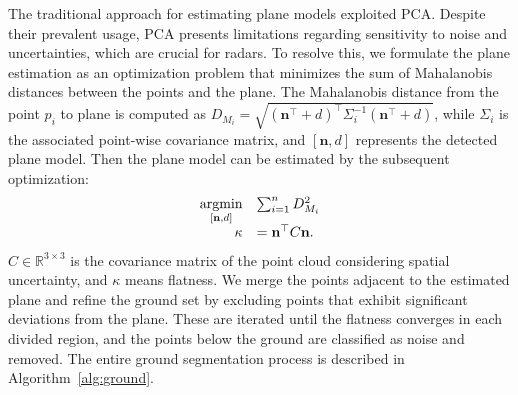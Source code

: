 The traditional approach for estimating plane models exploited \ac{PCA}. Despite their prevalent usage, \ac{PCA} presents limitations regarding sensitivity to noise and uncertainties, which are crucial for radars.
To resolve this, we formulate the plane estimation as an optimization problem that minimizes the sum of Mahalanobis distances between the points and the plane.
The Mahalanobis distance from the point $p_i$ to plane is computed as $D_{M_i} = \sqrt{(\mathbf{n}^\top+d)^\top \Sigma_i^{-1} (\mathbf{n}^\top+d)}$, while $\Sigma_i$ is the associated point-wise covariance matrix, and $[\textbf{n},d]$ represents the detected plane model. Then the plane model can be estimated by the subsequent optimization:
\vspace{-2mm}
\begin{equation}
\begin{array}{rrclcl}
    \displaystyle \argmin_{[\textbf{n},d]} & \multicolumn{3}{l}{\sum_{i=1}^n D_{M_i}^2} \\
    \kappa &= \textbf{n}^\top C\textbf{n}.
\end{array}
\label{eqn:plane_model}
\end{equation}
$C\in\mathbb{R}^{3\times 3}$ is the covariance matrix of the point cloud considering spatial uncertainty, and $\kappa$ means flatness.
We merge the points adjacent to the estimated plane and refine the ground set by excluding points that exhibit significant deviations from the plane. These are iterated until the flatness converges in each divided region, and the points below the ground are classified as noise and removed. The entire ground segmentation process is described in Algorithm~\ref{alg:ground}.

